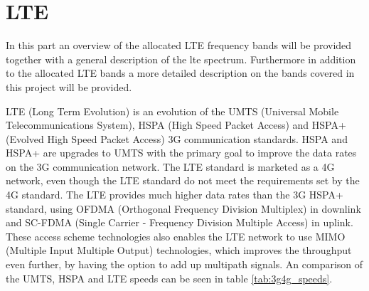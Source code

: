 \section{LTE}
In this part an overview of the allocated LTE frequency bands will be provided together with a general description of the lte spectrum.
Furthermore in addition to the allocated LTE bands a more detailed description on the bands covered in this project will be provided.

LTE (Long Term Evolution) is an evolution of the UMTS (Universal Mobile Telecommunications System), HSPA (High Speed Packet Access) and HSPA+ (Evolved High Speed Packet Access) 3G communication standards. HSPA and HSPA+ are upgrades to UMTS with the primary goal to improve the data rates on the 3G communication network. The LTE standard is marketed as a 4G network, even though the LTE standard do not meet the requirements set by the 4G standard.
The LTE provides much higher data rates than the 3G HSPA+ standard, using OFDMA (Orthogonal Frequency Division Multiplex) in downlink and SC-FDMA (Single Carrier - Frequency Division Multiple Access) in uplink. These access scheme technologies also enables the LTE network to use MIMO (Multiple Input Multiple Output) technologies, which improves the throughput even further, by having the option to add up multipath signals. An comparison of the UMTS, HSPA and LTE speeds can be seen in table \ref{tab:3g4g_speeds}. \cite{radio2015electronics} 

